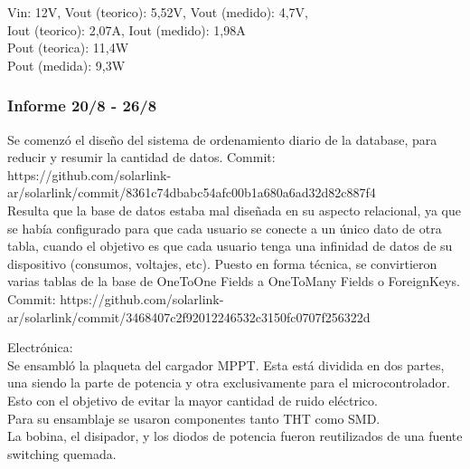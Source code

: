 Vin: 12V, Vout (teorico): 5,52V, Vout (medido): 4,7V, \\
Iout (teorico): 2,07A, Iout (medido): 1,98A\\
Pout (teorica): 11,4W\\
Pout (medida): 9,3W\\

\subsubsection{Informe 20/8 - 26/8}

Se comenzó el diseño del sistema de ordenamiento diario de la database, para reducir y resumir la cantidad de datos. Commit:\\
https://github.com/solarlink-\\ar/solarlink/commit/8361c74dbabc54afc00b1a680a6ad32d82c887f4\\

Resulta que la base de datos estaba mal diseñada en su aspecto relacional, ya que se había configurado para que cada usuario se conecte a un único dato de otra tabla, cuando el objetivo es que cada usuario tenga una infinidad de datos de su dispositivo (consumos, voltajes, etc). Puesto en forma técnica, se convirtieron varias tablas de la base de OneToOne Fields a OneToMany Fields o ForeignKeys. Commit:
https://github.com/solarlink-\\ar/solarlink/commit/3468407c2f92012246532c3150fc0707f256322d

Electrónica:\\

Se ensambló la plaqueta del cargador MPPT. Esta está dividida en dos partes, una siendo la parte de potencia y otra exclusivamente para el microcontrolador. Esto con el objetivo de evitar la mayor cantidad de ruido eléctrico.\\

Para su ensamblaje se usaron componentes tanto THT como SMD.\\

La bobina, el disipador, y los diodos de potencia fueron reutilizados de una fuente switching quemada.\\

